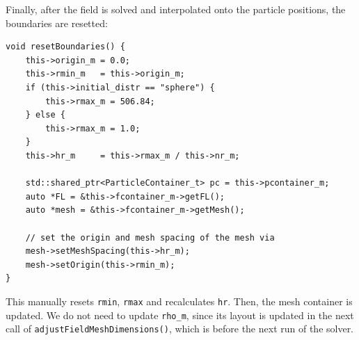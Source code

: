 Finally, after the field is solved and interpolated onto the particle positions, the boundaries are resetted:
\begin{lstlisting}
void resetBoundaries() {
    this->origin_m = 0.0;
    this->rmin_m   = this->origin_m;
    if (this->initial_distr == "sphere") {
        this->rmax_m = 506.84;
    } else {
        this->rmax_m = 1.0;
    }
    this->hr_m     = this->rmax_m / this->nr_m;

    std::shared_ptr<ParticleContainer_t> pc = this->pcontainer_m;
    auto *FL = &this->fcontainer_m->getFL();
    auto *mesh = &this->fcontainer_m->getMesh();
    
    // set the origin and mesh spacing of the mesh via
    mesh->setMeshSpacing(this->hr_m);
    mesh->setOrigin(this->rmin_m); 
}
\end{lstlisting}
This manually resets \verb|rmin|, \verb|rmax| and recalculates \verb|hr|. Then, the mesh container is updated. We do not need to update \verb|rho_m|, since its layout is updated in the next call of \verb|adjustFieldMeshDimensions()|, which is before the next run of the solver.



